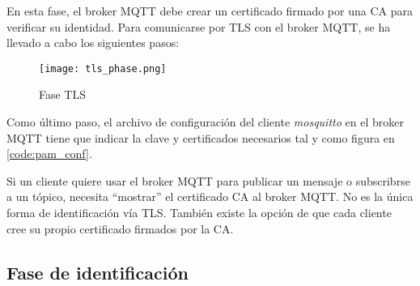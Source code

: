 En esta fase, el broker MQTT debe crear un certificado firmado por una CA para verificar su identidad. 
Para comunicarse por TLS con el broker MQTT, se ha llevado a cabo los siguientes pasos:


\begin{figure}[H]
    \centering
    \texttt{[image: tls\_phase.png]}
    \caption{Fase TLS}
\end{figure}

Como último paso, el archivo de configuración del cliente \textit{mosquitto} en el broker MQTT tiene que indicar la clave y 
certificados necesarios tal y como figura en \ref{code:pam_conf}.

Si un cliente quiere usar el broker MQTT para publicar un mensaje o subscribrse a un tópico, necesita ``mostrar'' el certificado
CA al broker MQTT. No es la única forma de identificación vía TLS. También existe la opción de que cada cliente
cree su propio certificado firmados por la CA.

\subsection{Fase de identificación}
\label{sec:id_phase}

